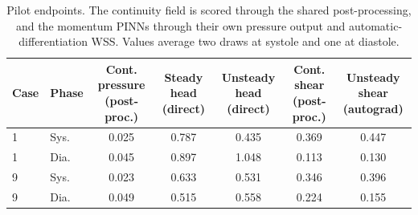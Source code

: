 \begin{table}[htbp]
\centering
\small
\caption{Pilot endpoints. The continuity field is scored through the shared post-processing, and the momentum PINNs through their own pressure output and automatic-differentiation WSS. Values average two draws at systole and one at diastole.}
\label{tab:pilot}
\begin{tabular}{llccccc}
\toprule
Case & Phase & \shortstack{Cont. pressure\\(post-proc.)} & \shortstack{Steady head\\(direct)} & \shortstack{Unsteady head\\(direct)} & \shortstack{Cont. shear\\(post-proc.)} & \shortstack{Unsteady shear\\(autograd)} \\
\midrule
1 & Sys. & 0.025 & 0.787 & 0.435 & 0.369 & 0.447 \\
1 & Dia. & 0.045 & 0.897 & 1.048 & 0.113 & 0.130 \\
9 & Sys. & 0.023 & 0.633 & 0.531 & 0.346 & 0.396 \\
9 & Dia. & 0.049 & 0.515 & 0.558 & 0.224 & 0.155 \\
\bottomrule
\end{tabular}
\end{table}
